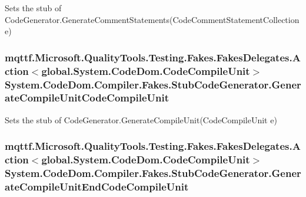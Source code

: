 Sets the stub of Code\-Generator.\-Generate\-Comment\-Statements(\-Code\-Comment\-Statement\-Collection e)

\hypertarget{class_system_1_1_code_dom_1_1_compiler_1_1_fakes_1_1_stub_code_generator_ab7d337d37102917f8cd6e6a083282b68}{
\subsubsection[{Generate\-Compile\-Unit\-Code\-Compile\-Unit}]{\setlength{\rightskip}{0pt plus 5cm}mqttf.\-Microsoft.\-Quality\-Tools.\-Testing.\-Fakes.\-Fakes\-Delegates.\-Action$<$global.\-System.\-Code\-Dom.\-Code\-Compile\-Unit$>$ System.\-Code\-Dom.\-Compiler.\-Fakes.\-Stub\-Code\-Generator.\-Generate\-Compile\-Unit\-Code\-Compile\-Unit}}\label{class_system_1_1_code_dom_1_1_compiler_1_1_fakes_1_1_stub_code_generator_ab7d337d37102917f8cd6e6a083282b68}


Sets the stub of Code\-Generator.\-Generate\-Compile\-Unit(\-Code\-Compile\-Unit e)

\hypertarget{class_system_1_1_code_dom_1_1_compiler_1_1_fakes_1_1_stub_code_generator_a2720222b67e1bec8d92070878c7a945c}{
\subsubsection[{Generate\-Compile\-Unit\-End\-Code\-Compile\-Unit}]{\setlength{\rightskip}{0pt plus 5cm}mqttf.\-Microsoft.\-Quality\-Tools.\-Testing.\-Fakes.\-Fakes\-Delegates.\-Action$<$global.\-System.\-Code\-Dom.\-Code\-Compile\-Unit$>$ System.\-Code\-Dom.\-Compiler.\-Fakes.\-Stub\-Code\-Generator.\-Generate\-Compile\-Unit\-End\-Code\-Compile\-Unit}}\label{class_system_1_1_code_dom_1_1_compiler_1_1_fakes_1_1_stub_code_generator_a2720222b67e1bec8d92070878c7a945c}


